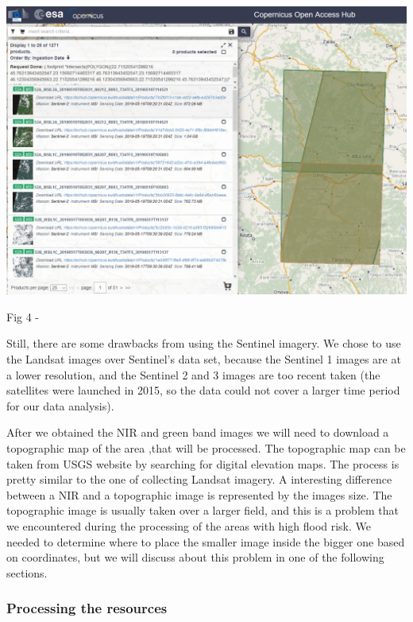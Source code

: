 \documentclass[12pt, a4paper]{report}
\begin{document}
\bigskip

\includegraphics[scale=0.54, center]{sentinel.png} 
\begin{center}
Fig 4 - \cite{Copernicus}
\end{center}
\par 


Still, there are some drawbacks from using the Sentinel imagery. We chose to use the Landsat images over Sentinel's data set, because the Sentinel 1 images are at a lower resolution, and the Sentinel 2 and 3 images are too recent taken (the satellites were launched in 2015, so the data could not cover a larger time period for our data analysis).
\par 

After we obtained the NIR and green band images we will need to download a topographic map of the area ,that will be processed. The topographic map can be taken from USGS website by searching for digital elevation maps. The process is pretty similar to the one of collecting Landsat imagery. A interesting difference between a NIR and a topographic image is represented by the images size. The topographic image is usually taken over a larger field, and this is a problem that we encountered during the processing of the areas with high flood risk. We needed to determine where to place the smaller image inside the bigger one based on coordinates, but we will discuss about this problem in one of the following sections.
\par

\subsubsection{Processing the resources}
\end{document}
